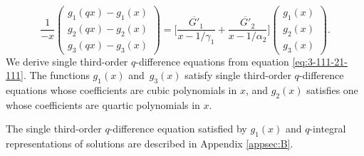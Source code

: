\documentclass[pdftex]{sigma}
\numberwithin{equation}{section}
\theoremstyle{definition}
\begin{document}
\begin{equation} \label{eq:3-111-21-111}
\frac{1}{-x}
\begin{pmatrix}
 g_1(qx) - g_1(x) \\
 g_2(qx) - g_2(x) \\
 g_3(qx) - g_3(x)
\end{pmatrix}
= \bigg[ \frac{\overline{G'}_1}{x-1/\gamma_1} + \frac{\overline{G'}_2}{x-1/\alpha_2} \bigg]
 \begin{pmatrix}
 g_1(x) \\
 g_2(x) \\
 g_3(x)
 \end{pmatrix}.
\end{equation}
We derive single third-order $q$-difference equations from equation \eqref{eq:3-111-21-111}.
The functions $g_1(x)$ and~$g_3(x)$ satisfy single third-order $q$-difference equations whose coefficients are cubic polynomials in $x$, and $g_2(x)$ satisfies one whose coefficients are quartic polynomials in $x$.

The single third-order $q$-difference equation satisfied by $g_1(x)$ and $q$-integral representations of solutions are described in Appendix \ref{appsec:B}.
\end{document}
